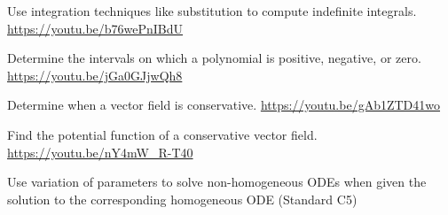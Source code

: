 \begin{readinessAssuranceResources}
\item Use integration techniques like substitution to compute indefinite integrals. \url{https://youtu.be/b76wePnIBdU}
\item Determine the intervals on which a polynomial is positive, negative, or zero. \url{https://youtu.be/jGa0GJjwQh8}
\item Determine when a vector field is conservative. \url{https://youtu.be/gAb1ZTD41wo}
\item Find the potential function of a conservative vector field. \url{https://youtu.be/nY4mW_R-T40}
\item Use variation of parameters to solve non-homogeneous ODEs when given the solution to the corresponding homogeneous ODE (Standard C5)
\end{readinessAssuranceResources}
